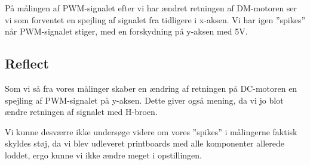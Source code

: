 \documentclass[../main.tex]{subfiles}
\begin{document}

På målingen af PWM-signalet efter vi har ændret retningen af DM-motoren ser vi som forventet en spejling af signalet fra tidligere i x-aksen. Vi har igen ”spikes” når PWM-signalet stiger, med en forskydning på y-aksen med 5V.

\subsection{Reflect}    
Som vi så fra vores målinger skaber en ændring af retningen på DC-motoren en spejling af PWM-signalet på y-aksen. Dette giver også mening, da vi jo blot ændre retningen af signalet med H-broen.

Vi kunne desværre ikke undersøge videre om vores ”spikes” i målingerne faktisk skyldes støj, da vi blev udleveret printboards med alle komponenter allerede loddet, ergo kunne vi ikke ændre meget i opstillingen. 
\end{document}
